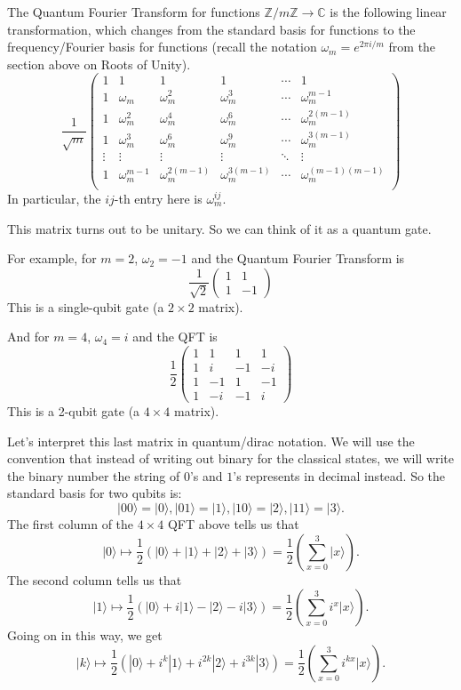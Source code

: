\documentclass{article}
\theoremstyle{plain}
\theoremstyle{definition}
\theoremstyle{remark}
\numberwithin{theorem}{section}
\newcommand{\ZZ}{\mathbb{Z}}
\newcommand{\CC}{\mathbb{C}}
\begin{document}
The Quantum Fourier Transform for functions $\ZZ/m\ZZ \rightarrow \CC$ is the following linear transformation, which changes from the standard basis for functions to the frequency/Fourier basis for functions (recall the notation $\omega_m = e^{2 \pi i / m}$ from the section above on Roots of Unity). 
\[
\frac{1}{\sqrt{m}}
\begin{pmatrix}
1& 1 & 1 & 1 & \cdots & 1 \\
1 & \omega_m & \omega_m^2 & \omega_m^3 & \cdots & \omega_m^{m-1} \\
1 & \omega_m^2 & \omega_m^4 & \omega_m^6 & \cdots & \omega_m^{2(m-1)} \\
1 & \omega_m^3 & \omega_m^6 & \omega_m^9 & \cdots & \omega_m^{3(m-1)} \\
\vdots & \vdots & \vdots & \vdots & \ddots & \vdots \\
1 & \omega_m^{m-1} & \omega_m^{2(m-1)} & \omega_m^{3(m-1)} & \cdots & \omega_m^{(m-1)(m-1)} \\
\end{pmatrix}
\]
In particular, the $ij$-th entry here is $\omega_m^{ij}$.  

This matrix turns out to be unitary.  So we can think of it as a quantum gate.  

For example, for $m=2$, $\omega_2 = -1$ and the Quantum Fourier Transform is
\[
\frac{1}{\sqrt{2}}
\begin{pmatrix}
1 & 1 \\
1 & -1
\end{pmatrix}
\]
This is a single-qubit gate (a $2 \times 2$ matrix).

And for $m=4$, $\omega_4 = i$ and the QFT is
\[
\frac{1}{2}
\begin{pmatrix}
1 & 1 & 1 & 1\\
1 & i & -1 & -i \\
1 & -1 & 1 & -1 \\
1 & -i & -1 & i
\end{pmatrix}
\]
This is a 2-qubit gate (a $4 \times 4$ matrix).

Let's interpret this last matrix in quantum/dirac notation.  We will use the convention that instead of writing out binary for the classical states, we will write the binary number the string of $0$'s and $1$'s represents in decimal instead.  So the standard basis for two qubits is:
\[
|00\rangle = |0\rangle , |01 \rangle = |1\rangle , |10\rangle = |2\rangle , |11 \rangle = |3\rangle.
\]
The first column of the $4 \times 4$ QFT above tells us that
\[
|0\rangle \mapsto \frac{1}{2}\left( |0\rangle + |1\rangle + |2 \rangle + |3 \rangle \right) = \frac{1}{2}\left( \sum_{x=0}^3 |x\rangle \right).
\]
The second column tells us that
\[
|1\rangle \mapsto \frac{1}{2}\left( |0\rangle + i|1\rangle - |2 \rangle -i |3 \rangle\right) = \frac{1}{2}\left( \sum_{x=0}^3 i^x |x\rangle \right).
\]
Going on in this way, we get
\[
|k\rangle \mapsto \frac{1}{2}\left( |0\rangle + i^k |1\rangle + i^{2k} |2 \rangle + i^{3k} |3 \rangle \right) = \frac{1}{2}\left( \sum_{x=0}^3 i^{kx} |x\rangle \right).
\]
\end{document}
